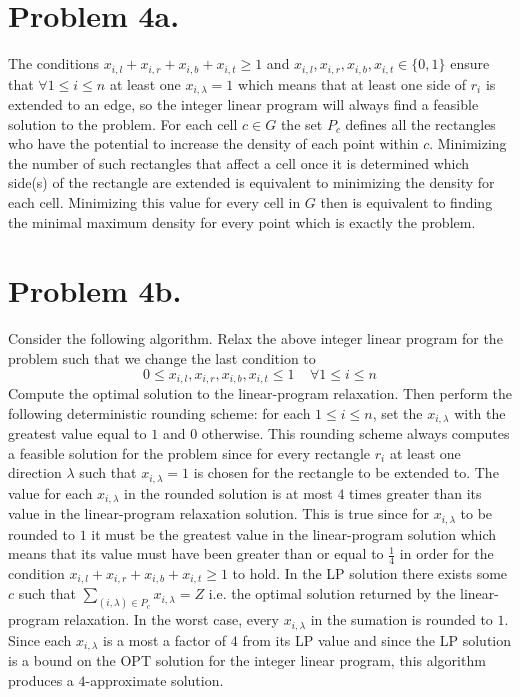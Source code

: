 \documentclass[12pt]{article}
\begin{document}
\pagestyle{plain}
\titleformat{\subsection}[runin]
  {\normalfont\large\bfseries}{\thesubsection}{1em}{}
\titleformat{\subsubsection}[runin]
  {\normalfont\large\bfseries}{\thesubsubsection}{1em}{}

\section*{Problem 4a.}
The conditions $x_{i,l} + x_{i,r} + x_{i,b} + x_{i,t} \ge 1$
and $x_{i,l}, x_{i,r}, x_{i,b}, x_{i,t} \in \{0,1\}$ ensure that
$\forall 1 \le i \le n$ at least one $x_{i,\lambda} = 1$ which means that at
least one side of $r_i$ is extended to an edge, so the integer linear program
will always find a feasible solution to the problem. For each cell $c \in G$ the
set $P_c$ defines all the rectangles who have the potential to increase the
density of each point within $c$. Minimizing the number of such rectangles that
affect a cell once it is determined which side(s) of the rectangle are extended
is equivalent to minimizing the density for each cell. Minimizing this value for
every cell in $G$ then is equivalent to finding the minimal maximum density for
every point which is exactly the problem.

\section*{Problem 4b.}
Consider the following algorithm. Relax the above integer linear program for the
problem such that we change the last condition to
$$0\le x_{i,l}, x_{i,r}, x_{i,b}, x_{i,t} \le 1\ \ \ \ \ \forall 1 \le i \le n$$
Compute the optimal solution to the linear-program relaxation. Then perform the
following deterministic rounding scheme: for each $1 \le i \le n$, set the
$x_{i,\lambda}$ with the greatest value equal to $1$ and $0$ otherwise. This
rounding scheme always computes a feasible solution for the problem since for
every rectangle $r_i$ at least one direction $\lambda$ such that
$x_{i,\lambda} = 1$ is chosen for the rectangle to be extended to. The value
for each $x_{i,\lambda}$ in the rounded solution is at most $4$ times greater
than its value in the linear-program relaxation solution. This is true since
for $x_{i,\lambda}$ to be rounded to $1$ it must be the greatest value in the
linear-program solution which means that its value must have been greater than
or equal to $\frac{1}{4}$ in order for the condition
$x_{i,l} + x_{i,r} + x_{i,b} + x_{i,t} \ge 1$ to hold. In the LP solution there
exists some $c$ such that $\sum_{(i,\lambda) \in P_c} x_{i,\lambda} = Z$ i.e.
the optimal solution returned by the linear-program relaxation. In the worst
case, every $x_{i,\lambda}$ in the sumation is rounded to $1$. Since each
$x_{i,\lambda}$ is a most a factor of $4$ from its LP value and since the
LP solution is a bound on the OPT solution for the integer linear program, this
algorithm produces a $4$-approximate solution.
\end{document}

